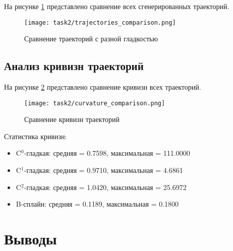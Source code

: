 На рисунке \ref{fig:trajectories_comparison} представлено сравнение всех сгенерированных траекторий.

\begin{figure}[H]
\centering
\texttt{[image: task2/trajectories\_comparison.png]}
\caption{Сравнение траекторий с разной гладкостью}
\label{fig:trajectories_comparison}
\end{figure}

\subsection{Анализ кривизн траекторий}

На рисунке \ref{fig:curvature_comparison} представлено сравнение кривизн всех траекторий.

\begin{figure}[H]
\centering
\texttt{[image: task2/curvature\_comparison.png]}
\caption{Сравнение кривизн траекторий}
\label{fig:curvature_comparison}
\end{figure}

Статистика кривизн:
\begin{itemize}
\item C$^0$-гладкая: средняя = 0.7598, максимальная = 111.0000
\item C$^1$-гладкая: средняя = 0.9710, максимальная = 4.6861
\item C$^2$-гладкая: средняя = 1.0420, максимальная = 25.6972
\item B-сплайн: средняя = 0.1189, максимальная = 0.1800
\end{itemize}

\section{Выводы}

